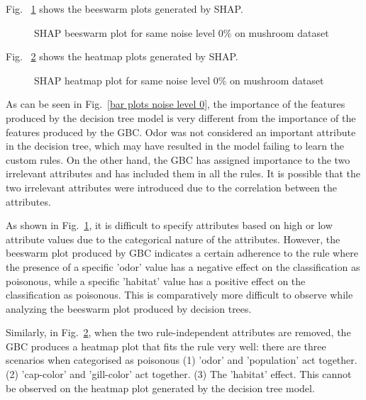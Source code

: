 \documentclass[runningheads,a4paper]{llncs}
\begin{document}
Fig. ~\ref{bee plots noise level 0} shows the beeswarm plots generated by SHAP.
\begin{figure}[H]
	\centering
	
	\hfill
	
	
	\caption{SHAP beeswarm plot for same noise level 0\% on mushroom dataset}
	\label{bee plots noise level 0}

\end{figure}
Fig. ~\ref{heat plots noise level 0} shows the heatmap plots generated by SHAP.
\begin{figure}[H]
	\centering
	
	\hfill
	
	
	\caption{SHAP heatmap plot for same noise level 0\% on mushroom dataset}
	\label{heat plots noise level 0}
	
\end{figure}
As can be seen in Fig.~\ref{bar plots noise level 0}, the importance of the features produced by the decision tree model is very different from the importance of the features produced by the GBC.
Odor was not considered an important attribute in the decision tree, which may have resulted in the model failing to learn the custom rules. On the other hand, the GBC has assigned importance to the two irrelevant attributes and has included them in all the rules. It is possible that the two irrelevant attributes were introduced due to the correlation between the attributes.

As shown in Fig.~\ref{bee plots noise level 0}, it is difficult to specify attributes based on high or low attribute values due to the categorical nature of the attributes. However, the beeswarm plot produced by GBC indicates a certain adherence to the rule where the presence of a specific 'odor' value has a negative effect on the classification as poisonous, while a specific 'habitat' value has a positive effect on the classification as poisonous. This is comparatively more difficult to observe while analyzing the beeswarm plot produced by decision trees.

Similarly, in Fig.~\ref{heat plots noise level 0}, when the two rule-independent attributes are removed, the GBC produces a heatmap plot that fits the rule very well: there are three scenarios when categorised as poisonous (1) 'odor' and 'population' act together. (2) 'cap-color' and 'gill-color' act together. (3) The 'habitat' effect. This cannot be observed on the heatmap plot generated by the decision tree model.
\end{document}
